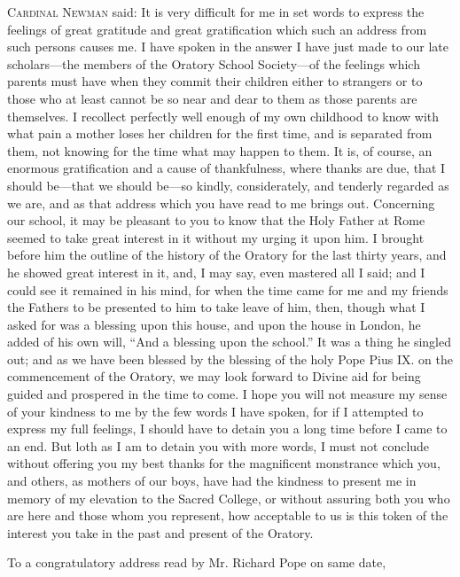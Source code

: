 C\textsc{ardinal} N\textsc{ewman}
said: It is very difficult for me in set words to express the feelings
of great gratitude and great gratification which such an address from
such persons causes me. I have spoken in the answer I have just made
to our late scholars—the members of the Oratory School Society—of
the feelings which parents must have when they commit their children
either to strangers or to those who at least cannot be so near and
dear to them as those parents are themselves. I recollect perfectly
well enough of my own childhood to know with what pain a mother
loses her children for the first time, and is separated from them, not
knowing for the time what may happen to them. It is, of course, an
enormous gratification and a cause of thankfulness, where thanks are
due, that I should be—that we should be—so kindly, considerately,
and tenderly regarded as we are, and as that address which you have
read to me brings out. Concerning our school, it may be pleasant to
you to know that the Holy Father at Rome seemed to take great interest
in it without my urging it upon him. I brought before him the outline
of the history of the Oratory for the last thirty years, and he showed
great interest in it, and, I may say, even mastered all I said; and I
could see it remained in his mind, for when the time came for me and
my friends the Fathers to be presented to him to take leave of him,
then, though what I asked for was a blessing upon this house, and upon
the house in London, he added of his own will, ``And a blessing upon
the school.'' It was a thing he singled out; and as we have been
blessed by the blessing of the holy Pope Pius IX. on the commencement
of the Oratory, we may look forward to Divine aid for being guided and
prospered in the time to come. I hope you will not measure my sense of
your kindness to me by the few words I have spoken, for if I attempted
to express my full feelings, I should have to detain you a long time
before I came to an end. But loth as I am to detain you with more
words, I must not conclude without offering you my best thanks for the
magnificent monstrance which you, and others, as mothers of our boys,
have had the kindness to present me in memory of my elevation to the
Sacred College, or without assuring both you who are here and those
whom you represent, how acceptable to us is this token of the interest
you take in the past and present of the Oratory.


To a congratulatory address read by Mr. Richard
Pope on same date,

